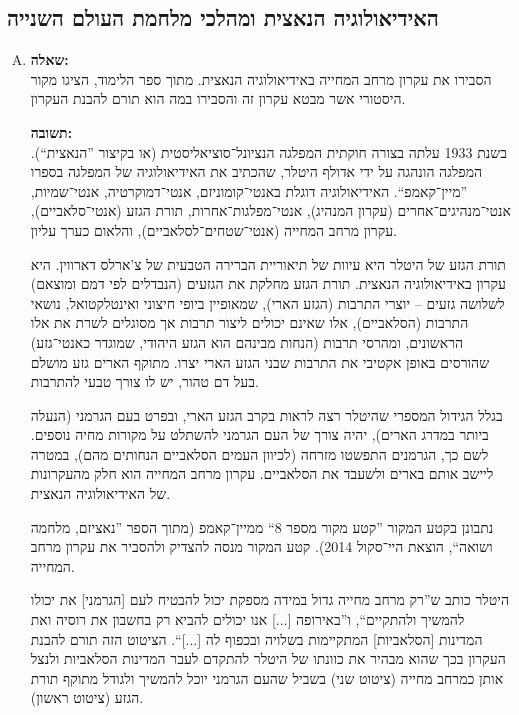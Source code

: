 \documentclass[a4paper]{article}
\newcommand\hl[1]   {#1}
\begin{document}
	\subsection{האידיאולוגיה הנאצית ומהלכי מלחמת העולם השנייה}
		\begin{enumerate}[A.]
			\item \textbf{שאלה: }\\
			הסבירו את עקרון מרחב המחייה באידיאולוגיה הנאצית. מתוך ספר הלימוד, הציגו מקור היסטורי אשר מבטא עקרון זה והסבירו במה הוא תורם להבנת העקרון. 
			
			\textbf{תשובה: }\\
			
			בשנת 1933 עלתה בצורה חוקתית המפלגה הנציונל־סוציאליסטית (או בקיצור ''\hl{הנאצית}``). המפלגה הונהגה על ידי \hl{אדולף היטלר}, שהכתיב את האידיאולוגיה של המפלגה בספרו ''מיין־קאמפ``. האידיאולוגיה דוגלת באנטי־קומוניזם, אנטי־דמוקרטיה, אנטי־שמיות, אנטי־מנהיגים־אחרים (עקרון המנהיג), אנטי־מפלגות־אחרות, תורת הגזע (אנטי־סלאביים), עקרון מרחב המחייה (אנטי־שטחים־לסלאביים), והלאום כערך עליון. 
			
			תורת הגזע של היטלר היא עיוות של תיאוריית הברירה הטבעית של צ'ארלס דארווין. היא עקרון באידיאולוגיה הנאצית. תורת הגזע מחלקת את הגזעים (הנבדלים לפי דמם ומוצאם) לשלושה גזעים – יוצרי התרבות (הגזע הארי), שמאופיין ביופי חיצוני ואינטלקטואל, נושאי התרבות (הסלאביים), אלו שאינם יכולים ליצור תרבות אך מסוגלים לשרת את אלו הראשונים, ומהרסי תרבות (הנחות מבינהם הוא הגזע היהודי, שמוגדר כאנטי־גזע) שהורסים באופן אקטיבי את התרבות שבני הגזע הארי יצרו. מתוקף הארים גזע מושלם בעל דם טהור, יש לו צורך טבעי להתרבות. 
			
			בגלל הגידול המספרי שהיטלר רצה לראות בקרב הגזע הארי, ובפרט בעם הגרמני (הנעלה ביותר במדרג הארים), יהיה צורך של העם הגרמני להשתלט על מקורות מחיה נוספים. לשם כך, הגרמנים התפשטו מזרחה (לכיוון העמים הסלאביים הנחותים מהם), במטרה ליישב אותם בארים ולשעבד את הסלאביים. עקרון מרחב המחייה הוא חלק מהעקרונות של האידיאולוגיה הנאצית. 
			
			נתבונן בקטע המקור ''קטע מקור מספר 8`` ממיין־קאמפ (מתוך הספר ''נאציזם, מלחמה ושואה``, הוצאת היי־סקול 2014). קטע המקור מנסה להצדיק ולהסביר את עקרון מרחב המחייה. 
			
			היטלר כותב ש''רק מרחב מחייה גדול במידה מספקת יכול להבטיח לעם [הגרמני] את יכולו להמשיך ולהתקיים``, ו''באירופה [...] אנו יכולים להביא רק בחשבון את רוסיה ואת המדינות [הסלאביות] המתקיימות בשלויה ובכפוף לה [...]``. הציטוט הזה תורם להבנת העקרון בכך שהוא מבהיר את כוונתו של היטלר להתקדם לעבר המדינות הסלאביות ולנצל אותן כמרחב מחייה (ציטוט שני) בשביל שהעם הגרמני יוכל להמשיך ולגודל מתוקף תורת הגזע (ציטוט ראשון). 
			

\end{enumerate}
\end{document}
